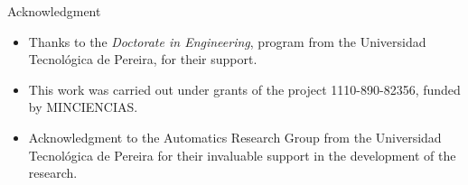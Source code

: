 \begin{frame}{Acknowledgment}
	\begin{block}{}
		\begin{itemize}
			\item Thanks to the \emph{Doctorate in Engineering}, program from the Universidad Tecnológica de Pereira, for their support.
			\item This work was carried out under grants of the project 1110-890-82356, funded by MINCIENCIAS.
			\item Acknowledgment to the Automatics Research Group from the Universidad Tecnológica de Pereira for their invaluable support in the development of the research.
		\end{itemize}
	\end{block}
\end{frame}
